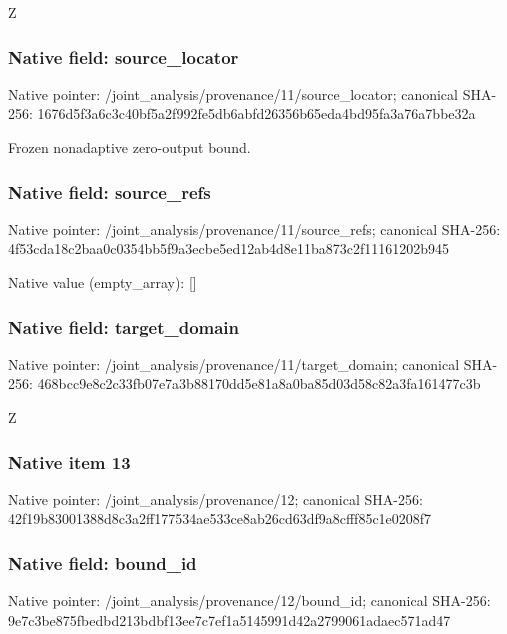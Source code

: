 \documentclass[10pt,a4paper]{article}
\begin{document}
\begingroup\raggedright\sloppy Z\par\endgroup

\subsubsection{Native field: source\_\allowbreak{}locator}
Native pointer: /joint\_\allowbreak{}analysis/provenance/11/source\_\allowbreak{}locator; canonical SHA-256: 1676d5f3a6c3c40bf5a2f992fe5db6abfd26356b65eda4bd95fa3a76a7bbe32a

\begingroup\raggedright\sloppy Frozen nonadaptive zero-output bound.\par\endgroup

\subsubsection{Native field: source\_\allowbreak{}refs}
Native pointer: /joint\_\allowbreak{}analysis/provenance/11/source\_\allowbreak{}refs; canonical SHA-256: 4f53cda18c2baa0c0354bb5f9a3ecbe5ed12ab4d8e11ba873c2f11161202b945

Native value (empty\_\allowbreak{}array): []

\subsubsection{Native field: target\_\allowbreak{}domain}
Native pointer: /joint\_\allowbreak{}analysis/provenance/11/target\_\allowbreak{}domain; canonical SHA-256: 468bcc9e8c2c33fb07e7a3b88170dd5e81a8a0ba85d03d58c82a3fa161477c3b

\begingroup\raggedright\sloppy Z\par\endgroup

\subsubsection{Native item 13}
Native pointer: /joint\_\allowbreak{}analysis/provenance/12; canonical SHA-256: 42f19b83001388d8c3a2ff177534ae533ce8ab26cd63df9a8cfff85c1e0208f7

\subsubsection{Native field: bound\_\allowbreak{}id}
Native pointer: /joint\_\allowbreak{}analysis/provenance/12/bound\_\allowbreak{}id; canonical SHA-256: 9e7c3be875fbedbd213bdbf13ee7c7ef1a5145991d42a2799061adaec571ad47
\end{document}
